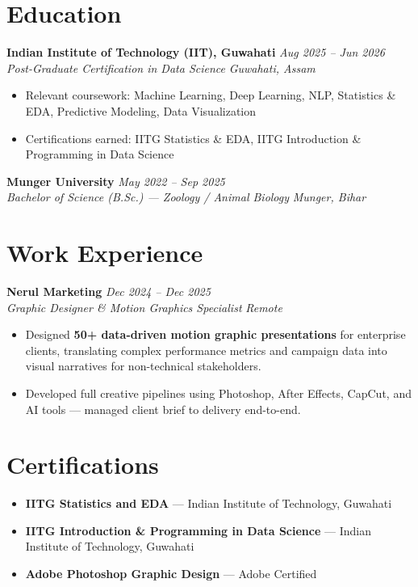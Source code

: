 \documentclass[11pt, a4paper]{article}
\newcommand{\resumeSubheading}[4]{
  \textbf{#1} \hfill \textit{#2} \\
  \textit{#3} \hfill \textit{#4}
  \vspace{2pt}
}
\begin{document}
\section{Education}

\resumeSubheading{Indian Institute of Technology (IIT), Guwahati}{Aug 2025 -- Jun 2026}
                 {Post-Graduate Certification in Data Science}{Guwahati, Assam}
\begin{itemize}
  \item Relevant coursework: Machine Learning, Deep Learning, NLP, Statistics \& EDA, Predictive Modeling, Data Visualization
  \item Certifications earned: IITG Statistics \& EDA, IITG Introduction \& Programming in Data Science
\end{itemize}

\vspace{4pt}

\resumeSubheading{Munger University}{May 2022 -- Sep 2025}
                 {Bachelor of Science (B.Sc.) --- Zoology / Animal Biology}{Munger, Bihar}

\vspace{2pt}

\section{Work Experience}

\resumeSubheading{Nerul Marketing}{Dec 2024 -- Dec 2025}
                 {Graphic Designer \& Motion Graphics Specialist}{Remote}
\begin{itemize}
  \item Designed \textbf{50+ data-driven motion graphic presentations} for enterprise clients, translating complex performance metrics and campaign data into visual narratives for non-technical stakeholders.
  \item Developed full creative pipelines using Photoshop, After Effects, CapCut, and AI tools --- managed client brief to delivery end-to-end.
\end{itemize}

\vspace{2pt}

\section{Certifications}

\begin{itemize}
  \item \textbf{IITG Statistics and EDA} --- Indian Institute of Technology, Guwahati
  \item \textbf{IITG Introduction \& Programming in Data Science} --- Indian Institute of Technology, Guwahati
  \item \textbf{Adobe Photoshop Graphic Design} --- Adobe Certified
\end{itemize}
\end{document}
